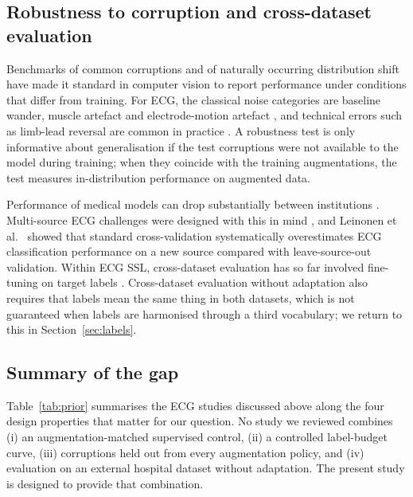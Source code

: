 \documentclass[preprint,12pt]{elsarticle}
\begin{document}
\subsection{Robustness to corruption and cross-dataset evaluation}

Benchmarks of common corruptions \cite{hendrycks2019corruptions} and of naturally occurring distribution shift \cite{koh2021} have made it standard in computer vision to report performance under conditions that differ from training. For ECG, the classical noise categories are baseline wander, muscle artefact and electrode-motion artefact \cite{moody1984}, and technical errors such as limb-lead reversal are common in practice \cite{batchvarov2007}. A robustness test is only informative about generalisation if the test corruptions were not available to the model during training; when they coincide with the training augmentations, the test measures in-distribution performance on augmented data.

Performance of medical models can drop substantially between institutions \cite{zech2018}. Multi-source ECG challenges were designed with this in mind \cite{perezalday2020}, and Leinonen et al.\ \cite{leinonen2024} showed that standard cross-validation systematically overestimates ECG classification performance on a new source compared with leave-source-out validation. Within ECG SSL, cross-dataset evaluation has so far involved fine-tuning on target labels \cite{soltanieh2024ood,lai2023}. Cross-dataset evaluation without adaptation also requires that labels mean the same thing in both datasets, which is not guaranteed when labels are harmonised through a third vocabulary; we return to this in Section~\ref{sec:labels}.

\subsection{Summary of the gap}

Table~\ref{tab:prior} summarises the ECG studies discussed above along the four design properties that matter for our question. No study we reviewed combines (i) an augmentation-matched supervised control, (ii) a controlled label-budget curve, (iii) corruptions held out from every augmentation policy, and (iv) evaluation on an external hospital dataset without adaptation. The present study is designed to provide that combination.
\end{document}
